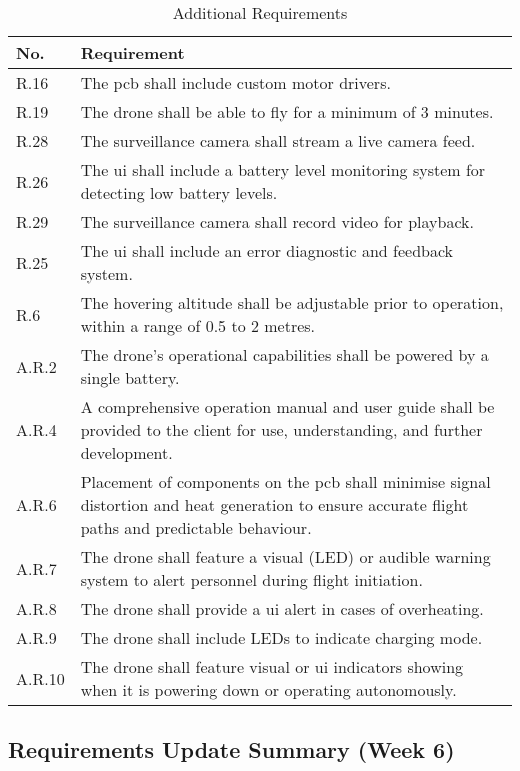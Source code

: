 \begin{table}[H]
\centering
\caption{Additional Requirements}
\begin{tabular}{|>{\centering\arraybackslash}p{} | p{}|}
\hline
\rowcolor{gray!15}
\textbf{No.} & \textbf{Requirement} \\
\hline
R.16 & The \gls{pcb} shall include custom motor drivers. \\
\hline
R.19 & The drone shall be able to fly for a minimum of 3 minutes. \\
\hline
R.28 & The surveillance camera shall stream a live camera feed. \\
\hline
R.26 & The \gls{ui} shall include a battery level monitoring system for detecting low battery levels. \\
\hline
R.29 & The surveillance camera shall record video for playback. \\
\hline
R.25 & The \gls{ui} shall include an error diagnostic and feedback system. \\
\hline
R.6  & The hovering altitude shall be adjustable prior to operation, within a range of 0.5 to 2 metres. \\
\hline
A.R.2 & The drone’s operational capabilities shall be powered by a single battery. \\
\hline
A.R.4 & A comprehensive operation manual and user guide shall be provided to the client for use, understanding, and further development. \\
\hline
A.R.6 & Placement of components on the \gls{pcb} shall minimise signal distortion and heat generation to ensure accurate flight paths and predictable behaviour. \\
\hline
A.R.7 & The drone shall feature a visual (LED) or audible warning system to alert personnel during flight initiation. \\
\hline
A.R.8 & The drone shall provide a \gls{ui} alert in cases of overheating. \\
\hline
A.R.9 & The drone shall include LEDs to indicate charging mode. \\
\hline
A.R.10 & The drone shall feature visual or \gls{ui} indicators showing when it is powering down or operating autonomously. \\
\hline
\end{tabular}
\end{table}

\pagebreak

\subsection{Requirements Update Summary (Week 6)}
\label{app:req-changes}

